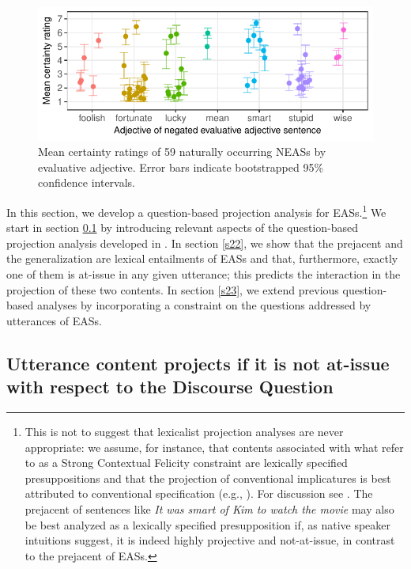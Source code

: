 \documentclass[11pt,fleqn]{article}
\newcommand{\6}{\mbox{$[\hspace*{-.6mm}[$}}
\newcommand{\9}{\mbox{$]\hspace*{-.6mm}]$}}
\begin{document}
\begin{figure}[h!]
\centering

\includegraphics[width=.6\paperwidth]{../exp1-corpus-study/graphs/mean-response-by-item-and-adj}

\caption{Mean certainty ratings of 59 naturally occurring NEASs by evaluative adjective. Error bars indicate bootstrapped 95\% confidence intervals.}\label{f-corpus}

\end{figure}

In this section, we develop a question-based projection analysis for EASs.\footnote{This is not to suggest that lexicalist projection analyses are never appropriate: we assume, for instance, that contents associated with what \citealt{brst-lang11} refer to as a Strong Contextual Felicity constraint are lexically specified presuppositions and that the projection of conventional implicatures is best attributed to conventional specification (e.g., \citealt{potts05,murray2014}). For discussion  see \citealt{brst-lang11,tbd-variability,tonhauser-etal-sub23}. The prejacent of sentences like {\em It was smart of Kim to watch the movie} may also be best analyzed as a lexically specified presupposition if, as native speaker intuitions suggest, it is indeed highly projective and not-at-issue, in contrast to the prejacent of EASs.} We start in section \ref{s21} by introducing relevant aspects of the question-based projection analysis developed in \citealt{best-question}. In section \ref{s22}, we show that the prejacent and the generalization are lexical entailments of EASs and that, furthermore, exactly one of them is at-issue in any given utterance; this predicts the interaction in the projection of these two contents. In section \ref{s23}, we extend previous question-based analyses by incorporating a constraint on the questions addressed by utterances of EASs.

\subsection{Utterance content projects if it is not at-issue with respect to the Discourse Question}\label{s21}
\end{document}

